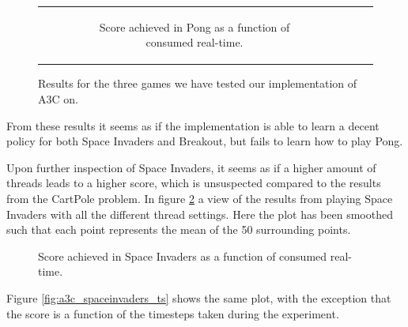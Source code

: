 \documentclass[11pt]{article}
\begin{document}
\begin{figure}[H]
\begin{tabular}[c]{ccc}
\begin{subfigure}[t]{.32\textwidth}
        \caption{Score achieved in Pong as a function of
        consumed real-time.}
    \end{subfigure}
  \end{tabular}
  \label{fig:all_atari}
  \caption{Results for the three games we have tested our implementation
           of A3C on.}
\end{figure}

From these results it seems as if the implementation is able to learn
a decent policy for both Space Invaders and Breakout, but fails
to learn how to play Pong.

Upon further inspection of Space Invaders, it seems as if
a higher amount of threads leads to a higher score, which is unsuspected
compared to the results from the CartPole problem.
In figure \ref{fig:a3c_spaceinvaders} a view of the results from
playing Space Invaders with all the different thread settings.
Here the plot has been smoothed such that each point represents the mean of the
50 surrounding points.

\begin{figure}[H]
    \caption{Score achieved in Space Invaders as a function of
    consumed real-time.}
    \label{fig:a3c_spaceinvaders}
\end{figure}

Figure \ref{fig:a3c_spaceinvaders_ts} shows the same plot, with the
exception that the score is a function of the timesteps taken
during the experiment.
\end{document}
